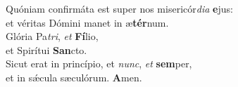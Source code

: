 \evenverse Quóniam confirmáta est super nos misericór\textit{di}\textit{a} \textbf{e}jus:~\*\\
\evenverse et véritas Dómini manet in æ\textbf{tér}num.\\
\oddverse Glória Pa\textit{tri}, \textit{et} \textbf{Fí}lio,~\*\\
\oddverse et Spirítui \textbf{San}cto.\\
\evenverse Sicut erat in princípio, et \textit{nunc}, \textit{et} \textbf{sem}per,~\*\\
\evenverse et in sǽcula sæculórum. \textbf{A}men.\\
